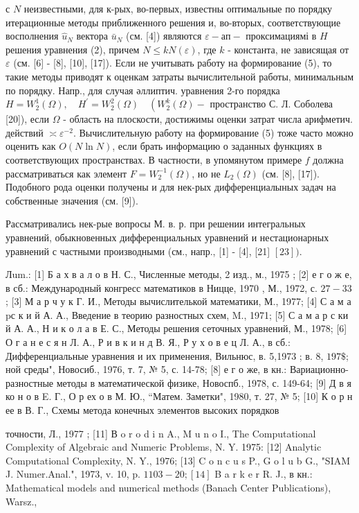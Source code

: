 \documentclass[10pt]{article}
\begin{document}
с $N$ неизвестными, для к-рых, во-первых, известны оптимальные по порядку итерационные методы приближенного решения и, во-вторых, соответствующие восполнения $\hat{u}_{N}$ вектора $\bar{u}_{N}$ (см. [4]) являются $\varepsilon-а п-$ проксимациямі в $H$ решения уравнения (2), причем $N \leqslant k N(\varepsilon)$, где $k$ - константа, не зависящая от $\varepsilon$ (см. [6] - [8], [10], [17]). Если не учитывать работу на формирование (5), то такие методы приводят к оценкам затраты вычислительной работы, минимальным по порядку. Напр., для случая әллиптич. уравнения 2-го порядка $H=W_{2}^{1}(\Omega), \quad H^{\prime}=W_{2}^{2}(\Omega) \quad\left(W_{2}^{k}(\Omega)-\right.$ пространство С. Л. Соболева [20]), если $\Omega$ - область на плоскости, достижимы оценки затрат числа арифметич. действий $\asymp \varepsilon^{-2}$. Вычислительную работу на формирование (5) тоже часто можно оценить как $O(N \ln N)$, если брать информацию о заданных функциях в соответствующих пространствах. В частности, в упомянутом примере $f$ должна рассматриваться как элемент $F=W_{2}^{-1}(\Omega)$, но не $L_{2}(\Omega)$ (см. [8], [17]). Подобного рода оценки получены и для нек-рых дифференциалыных задач на собственные значения (см. [9]).



Рассматривались нек-рые вопросы М. в. р. при решении интегральных уравнений, обыкновенных дифференциальных уравнений и нестационарных уравнений с частными производными (см., напр., [1] - [4], [21] $[23])$.



Лum.: [1] Б а х в а л о в Н. С., Численные методы, 2 изд., м., 1975 ; [2] е г о ж е, в сб.: Международный конгресс математиков в Ницце, 1970 , М., 1972, с. $27-33$; [3] М а р ч у к Г. И., Методы вычислителькой математики, М., 1977; [4] С а м а pс к и й А. А., Введение в теорию разностных схем, M., 1971; [5] С а м а р с ки й А. А., Н и к о л а в Е. С., Методы решения сеточных уравнений, М., 1978; [6] О г а н е с я н Л. А., Р и в к и н д В. Я., Р у х о в е ц Л. А., в сб.: Дифференциальные уравнения и их применения, Вильнюс, в. 5,1973 ; в. 8, $197 \$$; ной среды", Новосиб., 1976, т. 7, № 5, с. 14-78; [8] е г о же, в кн.: Вариационно-разностные методы в математической физике, Новоспб., 1978, с. 149-64; [9] Д в я ко н о в E. Г., О р ех о в М. Ю., “Матем. Заметки", 1980, т. 27, № 5; [10] К о р н ее в В. Г., Схемы метода конечных элементов высоких порядков

точности, Л., 1977 ; [11] В o r o d i n A., M u $\mathrm{n}$ o I., The Computational Complexity of Algebraic and Numeric Problems, N. Y. 1975: [12] Analytic Computational Complexity, N. Y., 1976; [13] C o n c u s P., G o l u b G., "SIAM J. Numer.Anal.", 1973, v. 10, p. $1103-20 ;[14]$ B a r k e r R. J., в кн.: Mathematical models and numerical methods (Banach Center Publications), Warsz.,
\end{document}
